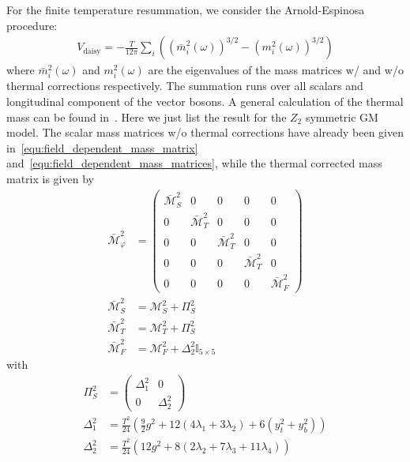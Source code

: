 \documentclass[12pt]{article}
\begin{document}
For the finite temperature resummation, we consider the Arnold-Espinosa procedure:
\begin{align}
    V_{\text{daisy}} = -\frac{T}{12\pi}\sum_i\left((\bar{m}_i^2(\omega))^{3/2}-(m_i^2(\omega))^{3/2}\right)
\end{align}
where $\bar{m}_i^2(\omega)$ and $m_i^2(\omega)$ are the eigenvalues of the mass matrices w/ and w/o thermal corrections respectively. The summation runs over all scalars and longitudinal component of the vector bosons. A general calculation of the thermal mass can be found in~\cite{Basler:2018cwe}. Here we just list the result for the $Z_2$ symmetric GM model. The scalar mass matrices w/o thermal corrections have already been given in~\autoref{equ:field_dependent_mass_matrix} and~\autoref{equ:field_dependent_mass_matrices}, while the thermal corrected mass matrix is given by
\begin{subequations}
    \begin{align}
\bar{\mathcal{M}}_\varphi^2 &= \begin{pmatrix}
    \bar{\mathcal{M}}_S^2 & 0 & 0 & 0 & 0 \\
    0 & \bar{\mathcal{M}}_T^2 & 0 & 0 & 0 \\
    0 & 0 & \bar{\mathcal{M}}_T^2 & 0 & 0 \\
    0 & 0 & 0 & \bar{\mathcal{M}}_T^2 & 0 \\
    0 & 0 & 0 & 0 & \bar{\mathcal{M}}_F^2
\end{pmatrix} \\
\bar{\mathcal{M}}_S^2 &= \mathcal{M}_S^2 + \Pi_S^2\\
\bar{\mathcal{M}}_T^2 &= \mathcal{M}_T^2 + \Pi_S^2\\
\bar{\mathcal{M}}_F^2 &= \mathcal{M}_F^2 + \Delta_2^2\mathbb{I}_{5\times5}
    \end{align}
\end{subequations}
with
\begin{subequations}
    \begin{align}
        \Pi_S^2 &= \begin{pmatrix}
            \Delta_1^2 & 0 \\
            0 & \Delta_2^2
        \end{pmatrix}\\
        \Delta_1^2 &= \frac{T^2}{24}\left(\frac{9}{2}g^2 + 12(4\lambda_1 + 3\lambda_2)+6(y_t^2+y_b^2)\right)\\
        \Delta_2^2 &= \frac{T^2}{24}\left(12g^2+8(2\lambda_2 + 7\lambda_3 + 11\lambda_4)\right)
    \end{align}
\end{subequations}
\end{document}
